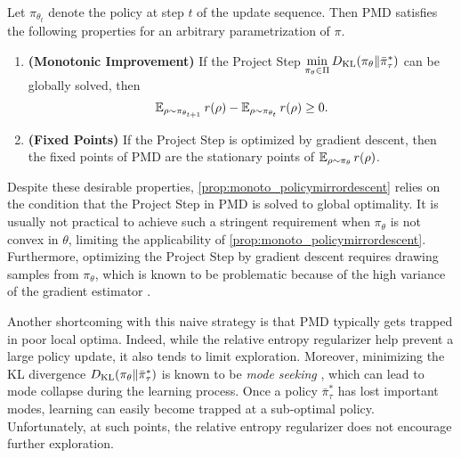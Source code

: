 \begin{prop}
\label{prop:monoto_policymirrordescent}
Let $\pi_{\theta_{t}}$ denote the policy at step $t$ of
the update sequence.
Then PMD satisfies the following properties for an arbitrary 
parametrization of $\pi$.
\begin{enumerate}
	\item {\bf (Monotonic Improvement)} 
	If the Project Step $\min\limits_{\pi_\theta \in \Pi}{D_{\mathrm{KL}}( \pi_\theta \| \bar{\pi}_{\tau}^* )}$ can be globally solved, then
	 \begin{equation*}
	\operatorname{\mathbb{E}}_{\rho \sim \pi_{\theta_{t+1}}}{r(\rho)} - \operatorname{\mathbb{E}}_{\rho \sim \pi_{\theta_{t}}}{  r(\rho)} \ge 0.
	\end{equation*}
	\item {\bf (Fixed Points)} If the Project Step is optimized by gradient descent, then the fixed points of PMD are the 
	 stationary points of $\operatorname{\mathbb{E}}_{\rho \sim \pi_\theta}{  r(\rho)}$. 
\end{enumerate}
\end{prop}
Despite these desirable properties, 
\cref{prop:monoto_policymirrordescent}
relies on the condition that the Project Step in PMD is solved to
global optimality.
It is usually not practical to achieve such a stringent requirement
when $\pi_\theta$ is not convex in $\theta$,
limiting the applicability of \cref{prop:monoto_policymirrordescent}.
Furthermore, optimizing the Project Step by gradient descent requires drawing samples from
$\pi_\theta$, which is known to be problematic because of the high variance of the gradient estimator \citep{greensmith2004variance}. 

Another shortcoming with this naive strategy is 
that PMD typically gets trapped in poor local optima.
Indeed, while the relative entropy regularizer help prevent
a large policy update, it also tends to limit exploration.
Moreover, minimizing the KL divergence
$D_{\mathrm{KL}}(\pi_\theta \| \bar{\pi}_\tau^*)$
is known to be \emph{mode seeking} \citep{kevin2012machine},
which can lead to mode collapse during the learning process.
Once a policy $\bar{\pi}_\tau^*$ has lost important modes,
learning can easily become trapped at a sub-optimal policy.
Unfortunately, at such points,
the relative entropy regularizer does not encourage further exploration.

